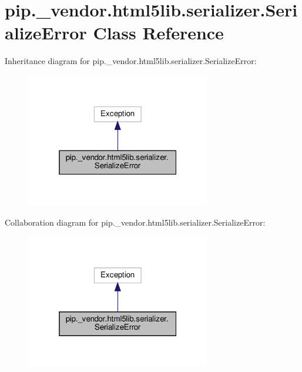 \hypertarget{classpip_1_1__vendor_1_1html5lib_1_1serializer_1_1SerializeError}{}\section{pip.\+\_\+vendor.\+html5lib.\+serializer.\+Serialize\+Error Class Reference}
\label{classpip_1_1__vendor_1_1html5lib_1_1serializer_1_1SerializeError}


Inheritance diagram for pip.\+\_\+vendor.\+html5lib.\+serializer.\+Serialize\+Error\+:
\nopagebreak
\begin{figure}[H]
\begin{center}
\leavevmode
\includegraphics[width=229pt]{classpip_1_1__vendor_1_1html5lib_1_1serializer_1_1SerializeError__inherit__graph}
\end{center}
\end{figure}


Collaboration diagram for pip.\+\_\+vendor.\+html5lib.\+serializer.\+Serialize\+Error\+:
\nopagebreak
\begin{figure}[H]
\begin{center}
\leavevmode
\includegraphics[width=229pt]{classpip_1_1__vendor_1_1html5lib_1_1serializer_1_1SerializeError__coll__graph}
\end{center}
\end{figure}


